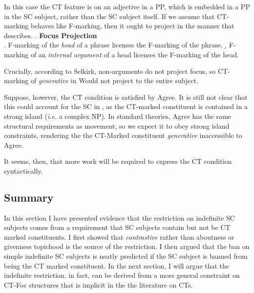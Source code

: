 \documentclass[GPFinal]{subfiles}
\begin{document}
In this case the CT feature is on an adjective in a PP, which is embedded in a PP in the SC subject, rather than the SC subject itself.
If we assume that CT-marking behaves like F-marking, then it ought to project in the manner that \textcite{selkirk1996sentence} describes.
\ex. \textbf{Focus Projection} \parencite{selkirk1996sentence}\\
\a. F-marking of the \textit{head} of a phrase licenses the F-marking of the phrase.
\b. F-marking of an \textit{internal argument} of a head licenses the F-marking of the head.

Crucially, according to Selkirk, non-arguments do not project focus, so CT-marking of \textit{generative} in \LLast Would not project to the entire subject.

Suppose, however, the CT condition is satisfied by Agree.
It is still not clear that this could account for the SC in \LLast, as the CT-marked constituent is contained in a strong island (\textit{i.e.} a complex NP).
In standard theories, Agree has the same structural requirements as movement, so we expect it to obey strong island constraints, rendering the the CT-Marked constituent \textit{generative} inaccessible to Agree.

It seems, then, that more work will be required to express the CT condition syntactically.

\subsection{Summary}
In this section I have presented evidence that the restriction on indefinite SC subjects comes from a requirement that SC subjects contain but not be CT marked constituents.
I first showed that \textit{contrastive} rather than aboutness or givenness topichood is the source of the restriction.
I then argued that the ban on simple indefinite SC subjects is neatly predicted if the SC subject is banned from being the CT marked constituent.
In the next section, I will argue that the indefinite restriction, in fact, can be derived from a more general constraint on CT-Foc structures that is implicit in the the literature on CTs.
\end{document}
